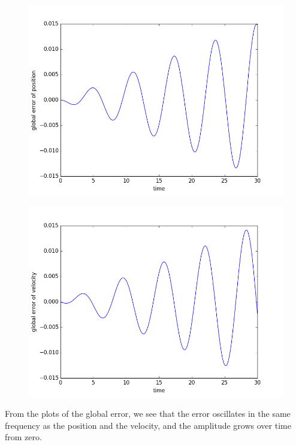 \documentclass[10pt]{article}
\begin{document}
\begin{figure}[!h]
	\centering
	\includegraphics[scale=0.5]{w3fig3.png}
\end{figure}

\begin{figure}[!h]
	\centering
	\includegraphics[scale=0.5]{w3fig4.png}
\end{figure}

From the plots of the global error, we see that the error oscillates in the same frequency as the position and the velocity, and the amplitude grows over time from zero. 

\newpage

\subsection{}
\end{document}
